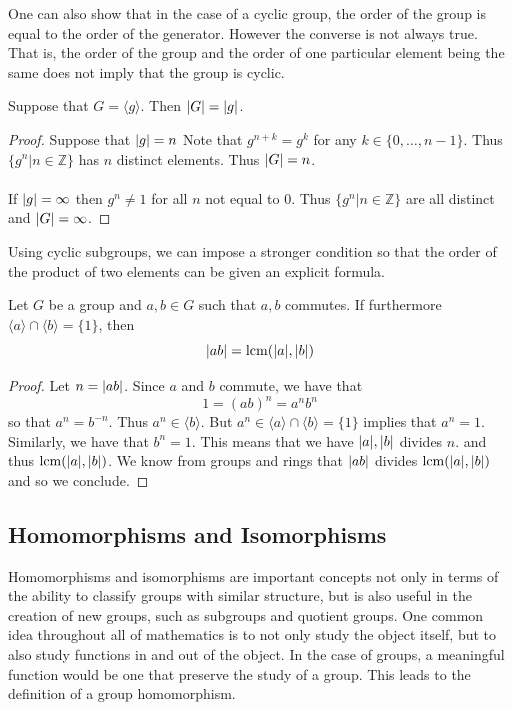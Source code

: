 \documentclass[a4paper]{article}
\begin{document}
One can also show that in the case of a cyclic group, the order of the group is equal to the order of the generator. However the converse is not always true. That is, the order of the group and the order of one particular element being the same does not imply that the group is cyclic. 

\begin{prp}{}{} Suppose that $G=\langle g\rangle $. Then $\abs{G}=\abs{g}$. \tcbline
\begin{proof} Suppose that $\abs{g}=n$ Note that $g^{n+k}=g^k$ for any $k\in\{0,\dots,n-1\}$. Thus $\{g^n|n\in\mathbb{Z}\}$ has $n$ distinct elements. Thus $\abs{G}=n$. \\~\\
If $\abs{g}=\infty$ then $g^n\neq 1$ for all $n$ not equal to $0$. Thus $\{g^n|n\in\mathbb{Z}\}$ are all distinct and $\abs{G}=\infty$.
\end{proof}
\end{prp}

Using cyclic subgroups, we can impose a stronger condition so that the order of the product of two elements can be given an explicit formula. 

\begin{prp}{}{} Let $G$ be a group and $a,b\in G$ such that $a,b$ commutes. If furthermore $\langle a\rangle\cap\langle b\rangle=\{1\}$, then $$\abs{ab}=\operatorname{lcm}(\abs{a},\abs{b})$$ \tcbline
\begin{proof}
Let $n=\abs{ab}$. Since $a$ and $b$ commute, we have that $$1=(ab)^n=a^nb^n$$ so that $a^n=b^{-n}$. Thus $a^n\in\langle b\rangle$. But $a^n\in\langle a\rangle\cap\langle b\rangle=\{1\}$ implies that $a^n=1$. Similarly, we have that $b^n=1$. This means that we have $\abs{a},\abs{b}$ divides $n$. and thus $\operatorname{lcm}(\abs{a},\abs{b})$. We know from groups and rings that $\abs{ab}$ divides $\operatorname{lcm}(\abs{a},\abs{b})$ and so we conclude. 
\end{proof}
\end{prp}

\subsection{Homomorphisms and Isomorphisms}
Homomorphisms and isomorphisms are important concepts not only in terms of the ability to classify groups with similar structure, but is also useful in the creation of new groups, such as subgroups and quotient groups. One common idea throughout all of mathematics is to not only study the object itself, but to also study functions in and out of the object. In the case of groups, a meaningful function would be one that preserve the study of a group. This leads to the definition of a group homomorphism. 
\end{document}
